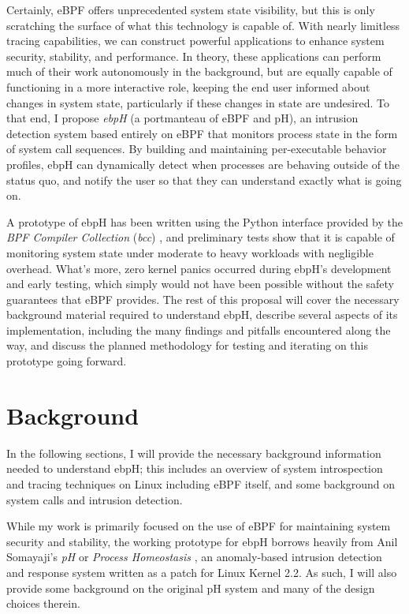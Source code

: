 \documentclass[
  12pt]{findlay}
\begin{document}
Certainly, eBPF offers unprecedented system state visibility, but this
is only scratching the surface of what this technology is capable of.
With nearly limitless tracing capabilities, we can construct powerful
applications to enhance system security, stability, and performance. In
theory, these applications can perform much of their work autonomously
in the background, but are equally capable of functioning in a more
interactive role, keeping the end user informed about changes in system
state, particularly if these changes in state are undesired. To that
end, I propose \emph{ebpH} (a portmanteau of eBPF and pH), an intrusion
detection system based entirely on eBPF that monitors process state in
the form of system call sequences. By building and maintaining
per-executable behavior profiles, ebpH can dynamically detect when
processes are behaving outside of the status quo, and notify the user so
that they can understand exactly what is going on.

A prototype of ebpH has been written using the Python interface provided
by the \emph{BPF Compiler Collection} (\emph{bcc}) \autocite{bcc}, and
preliminary tests show that it is capable of monitoring system state
under moderate to heavy workloads with negligible overhead. What's more,
zero kernel panics occurred during ebpH's development and early testing,
which simply would not have been possible without the safety guarantees
that eBPF provides. The rest of this proposal will cover the necessary
background material required to understand ebpH, describe several
aspects of its implementation, including the many findings and pitfalls
encountered along the way, and discuss the planned methodology for
testing and iterating on this prototype going forward.

\hypertarget{background}{%
\section{Background}\label{background}}

In the following sections, I will provide the necessary background
information needed to understand ebpH; this includes an overview of
system introspection and tracing techniques on Linux including eBPF
itself, and some background on system calls and intrusion detection.

While my work is primarily focused on the use of eBPF for maintaining
system security and stability, the working prototype for ebpH borrows
heavily from Anil Somayaji's \emph{pH} or \emph{Process Homeostasis}
\autocite{soma02}, an anomaly-based intrusion detection and response
system written as a patch for Linux Kernel 2.2. As such, I will also
provide some background on the original pH system and many of the design
choices therein.
\end{document}
